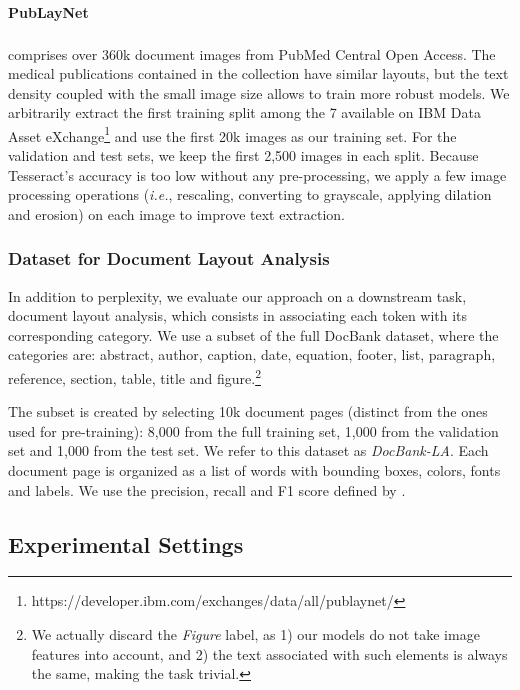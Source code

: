 \paragraph{PubLayNet} \citep{zhong2019publaynet} comprises over 360k document images from PubMed Central\textsuperscript{\texttrademark} Open Access. The medical publications contained in the collection have similar layouts, but the text density coupled with the small image size allows to train more robust models. We arbitrarily extract the first training split among the 7 available on IBM Data Asset eXchange\footnote{https://developer.ibm.com/exchanges/data/all/publaynet/} and use the first 20k images as our training set. For the validation and test sets, we keep the first 2,500 images in each split. Because Tesseract's accuracy is too low without any pre-processing, we apply a few image processing operations (\textit{i.e.}, rescaling, converting to grayscale, applying dilation and erosion) on each image to improve text extraction.

\subsubsection{Dataset for Document Layout Analysis}

In addition to perplexity, we evaluate our approach on a downstream task, document layout analysis, which consists in associating each token with its corresponding category. We use a subset of the full DocBank dataset, where the categories are: abstract, author, caption, date, equation, footer, list, paragraph, reference, section, table, title and figure.\footnote{We actually discard the \textit{Figure} label, as 1) our models do not take image features into account, and 2) the text associated with such elements is always the same, making the task trivial.}

The subset is created by selecting 10k document pages (distinct from the ones used for pre-training): 8,000 from the full training set, 1,000 from the validation set and 1,000 from the test set. We refer to this dataset as \textit{DocBank-LA}. Each document page is organized as a list of words with bounding boxes, colors, fonts and labels. We use the precision, recall and F1 score defined by \citet{li2020docbank}.

\subsection{Experimental Settings}

